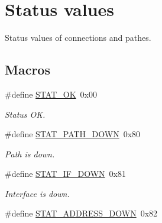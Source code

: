 \hypertarget{group___status_values}{\section{Status values}
\label{group___status_values}
}


Status values of connections and pathes.  


\subsection*{Macros}
\begin{DoxyCompactItemize}
\item 
\hypertarget{group___status_values_gaccd03d70d08e4382b9605079d6831f18}{\#define \hyperlink{group___status_values_gaccd03d70d08e4382b9605079d6831f18}{S\-T\-A\-T\-\_\-\-O\-K}~0x00}\label{group___status_values_gaccd03d70d08e4382b9605079d6831f18}

\begin{DoxyCompactList}\small\item\em Status O\-K. \end{DoxyCompactList}\item 
\hypertarget{group___status_values_ga955c58d0d8baed9e9fe6e56557db7ed3}{\#define \hyperlink{group___status_values_ga955c58d0d8baed9e9fe6e56557db7ed3}{S\-T\-A\-T\-\_\-\-P\-A\-T\-H\-\_\-\-D\-O\-W\-N}~0x80}\label{group___status_values_ga955c58d0d8baed9e9fe6e56557db7ed3}

\begin{DoxyCompactList}\small\item\em Path is down. \end{DoxyCompactList}\item 
\hypertarget{group___status_values_ga58d9616523b566f2d2f391a8ed762ba1}{\#define \hyperlink{group___status_values_ga58d9616523b566f2d2f391a8ed762ba1}{S\-T\-A\-T\-\_\-\-I\-F\-\_\-\-D\-O\-W\-N}~0x81}\label{group___status_values_ga58d9616523b566f2d2f391a8ed762ba1}

\begin{DoxyCompactList}\small\item\em Interface is down. \end{DoxyCompactList}\item 
\hypertarget{group___status_values_ga79a728901bc3b3e72599aa5578cd064b}{\#define \hyperlink{group___status_values_ga79a728901bc3b3e72599aa5578cd064b}{S\-T\-A\-T\-\_\-\-A\-D\-D\-R\-E\-S\-S\-\_\-\-D\-O\-W\-N}~0x82}\label{group___status_values_ga79a728901bc3b3e72599aa5578cd064b}


\end{DoxyCompactItemize}
